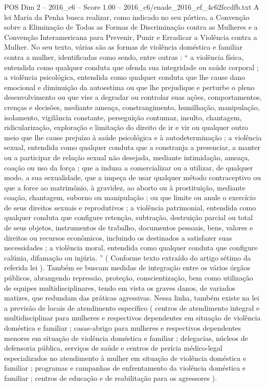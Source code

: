 \begin{textsample}{POS Dim 2 – 2016\_c6 – Score 1.00 – 2016\_c6/enade\_2016\_ef\_4c62fccdfb.txt}
A lei Maria da Penha busca realizar, como indicado no seu pórtico, a Convenção sobre a Eliminação de Todas as Formas de Discriminação contra as Mulheres e a Convenção Interamericana para Prevenir, Punir e Erradicar a Violência contra a Mulher.
No seu texto, várias são as formas de violência doméstica e familiar contra a mulher, identificadas como sendo, entre outras : “ a violência física, entendida como qualquer conduta que ofenda sua integridade ou saúde corporal ; a violência psicológica, entendida como qualquer conduta que lhe cause dano emocional e diminuição da autoestima ou que lhe prejudique e perturbe o pleno desenvolvimento ou que vise a degradar ou controlar suas ações, comportamentos, crenças e decisões, mediante ameaça, constrangimento, humilhação, manipulação, isolamento, vigilância constante, perseguição contumaz, insulto, chantagem, ridicularização, exploração e limitação do direito de ir e vir ou qualquer outro meio que lhe cause prejuízo à saúde psicológica e à autodeterminação ; a violência sexual, entendida como qualquer conduta que a constranja a presenciar, a manter ou a participar de relação sexual não desejada, mediante intimidação, ameaça, coação ou uso da força ; que a induza a comercializar ou a utilizar, de qualquer modo, a sua sexualidade, que a impeça de usar qualquer método contraceptivo ou que a force ao matrimônio, à gravidez, ao aborto ou à prostituição, mediante coação, chantagem, suborno ou manipulação ; ou que limite ou anule o exercício de seus direitos sexuais e reprodutivos ; a violência patrimonial, entendida como qualquer conduta que configure retenção, subtração, destruição parcial ou total de seus objetos, instrumentos de trabalho, documentos pessoais, bens, valores e direitos ou recursos econômicos, incluindo os destinados a satisfazer suas necessidades ; a violência moral, entendida como qualquer conduta que configure calúnia, difamação ou injúria. ” ( Conforme texto extraído do artigo sétimo da referida lei ).
Também se buscam medidas de integração entre os vários órgãos públicos, abrangendo repressão, proteção, conscientização, bem como utilização de equipes multidisciplinares, tendo em vista os graves danos, de variados matizes, que redundam das práticas agressivas.
Nessa linha, também existe na lei a previsão de locais de atendimento específico ( centros de atendimento integral e multidisciplinar para mulheres e respectivos dependentes em situação de violência doméstica e familiar ; casas-abrigo para mulheres e respectivos dependentes menores em situação de violência doméstica e familiar ; delegacias, núcleos de defensoria pública, serviços de saúde e centros de perícia médico-legal especializados no atendimento à mulher em situação de violência doméstica e familiar ; programas e campanhas de enfrentamento da violência doméstica e familiar ; centros de educação e de reabilitação para os agressores ).

\end{textsample}
